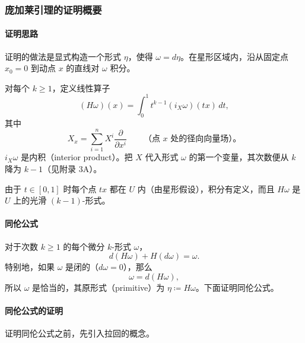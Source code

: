 \subsubsection{庞加莱引理的证明概要}
\paragraph{证明思路}
证明的做法是显式构造一个形式 $\eta$，使得 $\omega=d\eta$。在星形区域内，沿从固定点 $x_0=0$ 到动点 $x$ 的直线对 $\omega$ 积分。

对每个 $k\geq 1$，定义线性算子
\[
  (H\omega)(x)=\int_0^1 t^{k-1}(i_X\omega)(tx)\,dt,
\]
其中
\[
  X_x=\sum_{i=1}^n X^i\frac{\partial}{\partial x^i}\qquad
  \text{（点 $x$ 处的径向向量场）。}
\]
$i_X\omega$ 是内积（interior product）。把 $X$ 代入形式 $\omega$ 的第一个变量，其次数便从 $k$ 降为 $k-1$（见附录 3A）。%

由于 $t\in[0,1]$ 时每个点 $tx$ 都在 $U$ 内（由星形假设），积分有定义，而且 $H\omega$ 是 $U$ 上的光滑 $(k-1)$-形式。

\paragraph{同伦公式}
对于次数 $k\geq1$ 的每个微分 $k$-形式 $\omega$，
\begin{equation*}
  d(H\omega)+H(d\omega)=\omega.
  \tag{3.7}\label{eq:3.7}
\end{equation*}
特别地，如果 $\omega$ 是闭的（$d\omega=0$），那么
\[
  \omega=d(H\omega),
\]
所以 $\omega$ 是恰当的，其原形式（primitive）为 $\eta\coloneqq H\omega$。下面证明同伦公式。

\paragraph{同伦公式的证明}
证明同伦公式之前，先引入拉回的概念。

